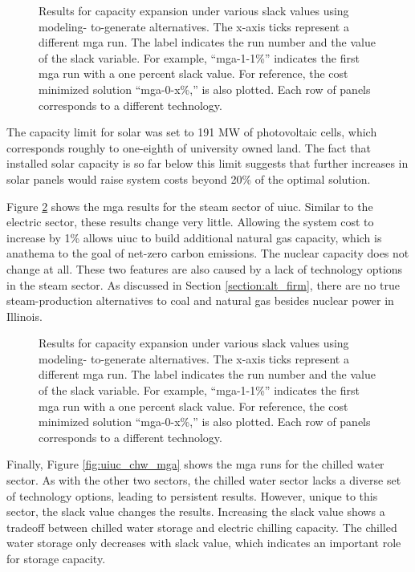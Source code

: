 \begin{figure}[H]
  \centering
  \resizebox{0.95\columnwidth}{!}{}
  \caption{Results for capacity expansion under various slack values using modeling-
  to-generate alternatives. The x-axis ticks represent a different \gls{mga} run.
  The label indicates the run number and the value of the slack variable. For example,
  ``mga-1-1\%'' indicates the first \gls{mga} run with a one percent
  slack value. For reference, the cost minimized solution ``mga-0-x\%,'' is also
  plotted. Each row of panels corresponds to a different technology.}
  \label{fig:uiuc_elc_mga}
\end{figure}

The capacity limit for solar was set to 191 MW of photovoltaic cells, which corresponds
roughly to one-eighth of university owned land. The fact that installed solar capacity
is so far below this limit suggests that further increases in solar panels would
raise system costs beyond 20\% of the optimal solution.

Figure \ref{fig:uiuc_thm_mga} shows the \gls{mga} results for the steam sector
of \gls{uiuc}. Similar to the electric sector, these results change very little.
Allowing the system cost to increase by 1\% allows \gls{uiuc} to build additional
natural gas capacity, which is anathema to the goal of net-zero carbon emissions.
The nuclear capacity does not change at all. These two features are also caused
by a lack of technology options in the steam sector. As discussed in Section \ref{section:alt_firm},
there are no true steam-production alternatives to coal and natural gas besides nuclear power 
in Illinois.


\begin{figure}[H]
  \centering
  \resizebox{0.95\columnwidth}{!}{}
  \caption{Results for capacity expansion under various slack values using modeling-
  to-generate alternatives. The x-axis ticks represent a different \gls{mga} run.
  The label indicates the run number and the value of the slack variable. For example,
  ``mga-1-1\%'' indicates the first \gls{mga} run with a one percent
  slack value. For reference, the cost minimized solution ``mga-0-x\%,'' is also
  plotted. Each row of panels corresponds to a different technology.}
  \label{fig:uiuc_thm_mga}
\end{figure}

Finally, Figure \ref{fig:uiuc_chw_mga} shows the \gls{mga} runs for the chilled
water sector. As with the other two sectors, the chilled water sector lacks a
diverse set of technology options, leading to persistent results. However,
unique to this sector, the slack value changes the results. Increasing the slack
value shows a tradeoff between chilled water storage and electric chilling capacity.
The chilled water storage only decreases with slack value, which indicates an
important role for storage capacity.

